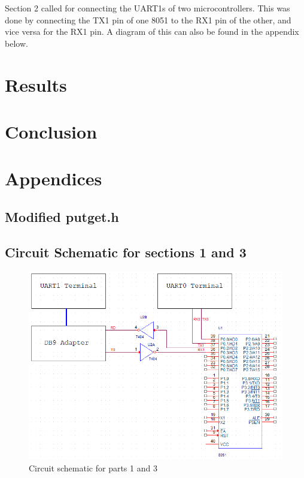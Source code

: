 \documentclass[12pt]{article}
\begin{document}
Section 2 called for connecting the UART1s of two microcontrollers. This was done by connecting the TX1 pin of one 8051 to the RX1 pin of the other, and vice versa for the RX1 pin. A diagram of this can also be found in the appendix below.


\section{Results}




\section{Conclusion}





\pagebreak
\section{Appendices}
\subsection{Modified putget.h}
	
\subsection{Circuit Schematic for sections 1 and 3}
	\begin{figure}[H]
		\centering
		\includegraphics{Part1Schematic.png}
		\caption{Circuit schematic for parts 1 and 3}
		\label{schematic}
	\end{figure} 
\end{document}
